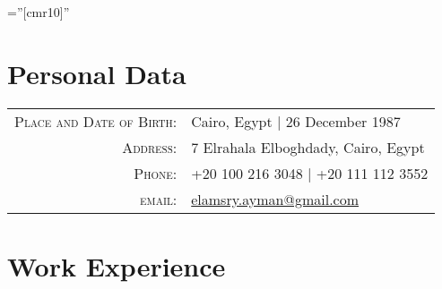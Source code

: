\documentclass[a4paper,10pt]{article} %
\begin{document}
\pagestyle{empty} %

\font\fb=''[cmr10]'' %


\par{\bigskip\par} %

\section{Personal Data}

\begin{tabular}{rl}
\textsc{Place and Date of Birth:} & Cairo, Egypt | 26 December 1987 \\
\textsc{Address:} & 7 Elrahala Elboghdady, Cairo, Egypt \\
\textsc{Phone:} & +20 100 216 3048 | +20 111 112 3552 \\
\textsc{email:} & \href{mailto:elmasry.ayman@gmail.com}{elamsry.ayman@gmail.com}
\end{tabular}


\section{Work Experience}
\end{document}
